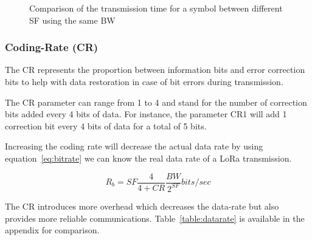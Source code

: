 \begin{figure}[H]
\centering
{}
\caption{Comparison of the transmission time for a symbol between different SF
  using the same BW\label{fig:sfcomp}}
\end{figure}

\subsubsection{Coding-Rate (CR)}

The CR represents the proportion between information bits and error
correction bits to help with data restoration in case of bit errors
during transmission.

The CR parameter can range from 1 to 4 and stand for the number of correction
bits added every 4 bits of data.
For instance, the parameter CR1 will add 1 correction bit every 4 bits of data
for a total of 5 bits.

Increasing the coding rate will decrease the actual data rate by using
equation~\ref{eq:bitrate} we can know the real data rate of a LoRa transmission.

\begin{equation}
 \label{eq:datarate}
  R_{b} = SF \frac{4}{4 + CR} \frac{BW}{2^{SF}} bits/sec
\end{equation}

The CR introduces more overhead which decreases the data-rate but also
provides more reliable communications.
Table~\ref{table:datarate} is available in the appendix for comparison.


